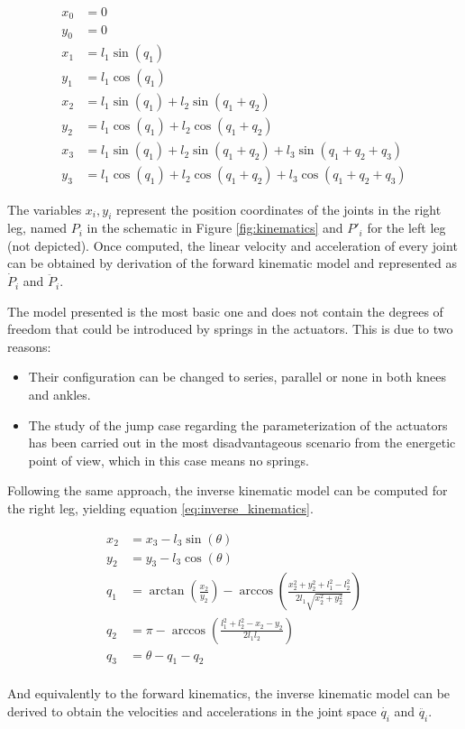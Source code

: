 \begin{equation}
\label{eq:forward_kinematics}
	\begin{aligned}
		x_{0} &= 0 \\
		y_{0} &= 0 \\
		x_{1} &= l_{1} \sin(q_{1}) \\
		y_{1} &= l_{1} \cos(q_{1}) \\
		x_{2} &= l_{1} \sin(q_{1}) + l_{2} \sin(q_{1}+q_{2}) \\
		y_{2} &= l_{1} \cos(q_{1}) + l_{2} \cos(q_{1}+q_{2}) \\
		x_{3} &= l_{1} \sin(q_{1}) + l_{2} \sin(q_{1}+q_{2}) + l_{3} \sin(q_{1}+q_{2}+q_{3}) \\
		y_{3} &= l_{1} \cos(q_{1}) + l_{2} \cos(q_{1}+q_{2}) + l_{3} \cos(q_{1}+q_{2}+q_{3}) 
	\end{aligned}
\end{equation}

The variables $x_{i}, y_{i}$ represent the position coordinates of the joints in the right leg, named $P_{i}$ in the schematic in Figure \ref{fig:kinematics} and $P'_{i}$ for the left leg (not depicted).
Once computed, the linear velocity and acceleration of every joint can be obtained by derivation of the forward kinematic model and represented as $\dot{P}_{i}$ and $\ddot{P}_{i}$.


The model presented is the most basic one and does not contain the degrees of freedom that could be introduced by springs in the actuators.
This is due to two reasons:

\begin{itemize}
	\item Their configuration can be changed to series, parallel or none in both knees and ankles.
	\item The study of the jump case regarding the parameterization of the actuators has been carried out in the most disadvantageous scenario from the energetic point of view, which in this case means no springs.
\end{itemize}

Following the same approach, the inverse kinematic model can be computed for the right leg, yielding equation \ref{eq:inverse_kinematics}.

\begin{equation}
\label{eq:inverse_kinematics}
	\begin{aligned}
		x_{2} &= x_{3} - l_{3} \sin(\theta) \\
		y_{2} &= y_{3} - l_{3} \cos(\theta) \\
		q_{1} &= \arctan \left(\frac{x_{2}}{y_{2}}\right) - \arccos \left(\frac{x_{2}^2 + y_{2}^2 + l_{1}^2 - l_{2}^2}{2 l_{1} \sqrt{x_{2}^2 + y_{2}^2}}\right) \\
		q_{2} &= \pi - \arccos \left(\frac{l_{1}^2 + l_{2}^2 - x_{2} - y_{2}}{2 l_{1} l_{2}}\right) \\
		q_{3} &= \theta - q_{1} - q_{2} \\
	\end{aligned}
\end{equation}

And equivalently to the forward kinematics, the inverse kinematic model can be derived to obtain the velocities and accelerations in the joint space $\dot{q_{i}}$ and $\ddot{q_{i}}$.

